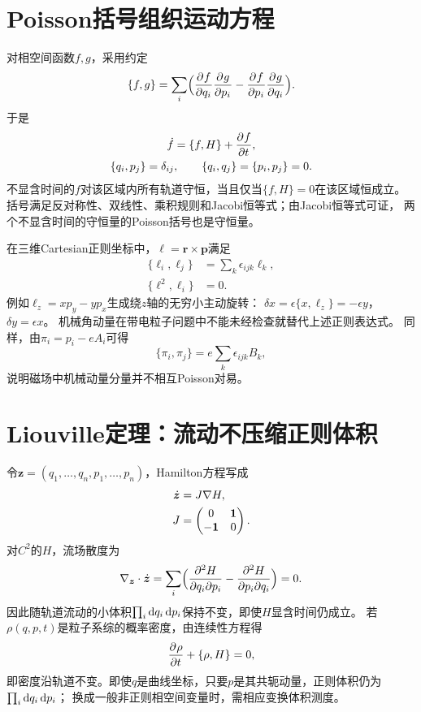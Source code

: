 \section{Poisson括号组织运动方程}
对相空间函数$f,g$，采用约定
\begin{equation}
 \{f,g\} = \sum_i\Bigl(\frac{\partial^{}f}{\partial{q_i}^{}}\frac{\partial^{}g}{\partial{p_i}^{}} - \frac{\partial^{}f}{\partial{p_i}^{}}\frac{\partial^{}g}{\partial{q_i}^{}}\Bigr).
\end{equation}
于是
\begin{subequations}
 \begin{gather}
  \dot f = \{f,H\} + \frac{\partial^{}f}{\partial{t}^{}},\\
  \{q_i,p_j\} = \delta_{ij},\qquad \{q_i,q_j\} = \{p_i,p_j\} = 0.
 \end{gather}
\end{subequations}
不显含时间的$f$对该区域内所有轨道守恒，当且仅当$\{f,H\} = 0$在该区域恒成立。
括号满足反对称性、双线性、乘积规则和Jacobi恒等式；由Jacobi恒等式可证，
两个不显含时间的守恒量的Poisson括号也是守恒量。

在三维Cartesian正则坐标中，$\bm\ell = \bm r \times \bm p$满足
\begin{subequations}
 \begin{align}
  \{\ell_i,\ell_j\} &= \sum_k\epsilon_{ijk}\ell_k,\\
  \{\ell^2,\ell_i\} &= 0.
 \end{align}
\end{subequations}
例如$\ell_z = xp_y - yp_x$生成绕$z$轴的无穷小主动旋转：
$\delta x = \epsilon\{x,\ell_z\} = -\epsilon y$，$\delta y = \epsilon x$。
机械角动量在带电粒子问题中不能未经检查就替代上述正则表达式。
同样，由$\pi_i = p_i - eA_i$可得
\begin{equation}
 \{\pi_i,\pi_j\} = e\sum_k\epsilon_{ijk}B_k,
\end{equation}
说明磁场中机械动量分量并不相互Poisson对易。

\section{Liouville定理：流动不压缩正则体积}
令$\bm z = (q_1,\ldots,q_n,p_1,\ldots,p_n)$，Hamilton方程写成
\begin{subequations}
 \begin{align}
  \dot{\bm{z}} &= J\nabla H,\\
  J &= \begin{pmatrix}0&\mathbf 1\\-\mathbf 1&0\end{pmatrix}.
 \end{align}
\end{subequations}
对$C^2$的$H$，流场散度为
\begin{equation}
 \nabla_{\bm z} \cdot \dot{\bm{z}}
 = \sum_i\Bigl(\frac{\partial^2H}{\partial q_i\partial p_i}
 - \frac{\partial^2H}{\partial p_i\partial q_i}\Bigr) = 0.
\end{equation}
因此随轨道流动的小体积$\textstyle \prod_i\mathop{}\!\mathrm{d} q_i\mathop{}\!\mathrm{d} p_i$保持不变，即使$H$显含时间仍成立。
若$\rho(q,p,t)$是粒子系综的概率密度，由连续性方程得
\begin{equation}
 \frac{\partial^{}\rho}{\partial{t}^{}} + \{\rho,H\} = 0,
\end{equation}
即密度沿轨道不变。即使$q$是曲线坐标，只要$p$是其共轭动量，正则体积仍为$\textstyle \prod_i\mathop{}\!\mathrm{d} q_i\mathop{}\!\mathrm{d} p_i$；
换成一般非正则相空间变量时，需相应变换体积测度。

